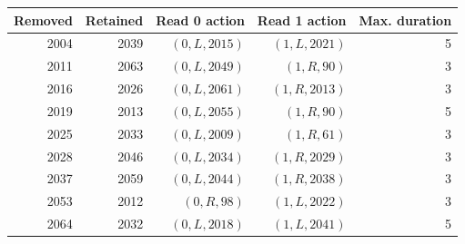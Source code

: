 \begin{center}\small
\begin{tabular}{rrrrr}
\toprule
Removed & Retained & Read 0 action & Read 1 action & Max. duration\\
\midrule
2004 & 2039 & $(0,L,2015)$ & $(1,L,2021)$ & 5\\
2011 & 2063 & $(0,L,2049)$ & $(1,R,90)$ & 3\\
2016 & 2026 & $(0,L,2061)$ & $(1,R,2013)$ & 3\\
2019 & 2013 & $(0,L,2055)$ & $(1,R,90)$ & 5\\
2025 & 2033 & $(0,L,2009)$ & $(1,R,61)$ & 3\\
2028 & 2046 & $(0,L,2034)$ & $(1,R,2029)$ & 3\\
2037 & 2059 & $(0,L,2044)$ & $(1,R,2038)$ & 3\\
2053 & 2012 & $(0,R,98)$ & $(1,L,2022)$ & 3\\
2064 & 2032 & $(0,L,2018)$ & $(1,L,2041)$ & 5\\
\bottomrule
\end{tabular}
\end{center}
